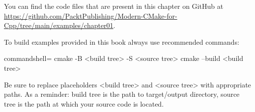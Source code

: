 You can find the code files that are present in this chapter on GitHub at \url{https://github.com/PacktPublishing/Modern-CMake-for-Cpp/tree/main/examples/chapter01}.

To build examples provided in this book always use recommended commands:

\begin{tcblisting}{commandshell={}}
cmake -B <build tree> -S <source tree>
cmake --build <build tree>
\end{tcblisting}

Be sure to replace placeholders <build tree> and <source tree> with appropriate paths. As a reminder: build tree is the path to target/output directory, source tree is the path at which your source code is located.














